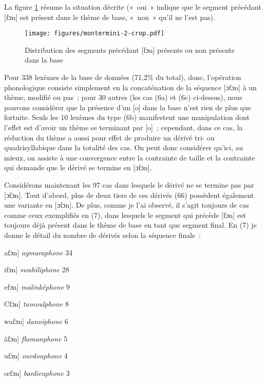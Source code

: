 \documentclass[output=paper]{langsci/langscibook}
\begin{document}
La figure \ref{fig:Montermini:2} résume la situation décrite («~oui~» indique que le segment
précédant {[}fɔn{]} est présent dans le thème de base, «~non~» qu'il ne
l'est pas).

\begin{figure} 
{\texttt{[image: figures/montermini-2-crop.pdf]}}
\caption{Distribution des segments précédant {[}fɔn{]}
présents ou non présents dans la base}
\label{fig:Montermini:2}
\end{figure}

Pour 338 lexèmes de la base de données (71,2\% du total), donc,
l'opération phonologique consiste simplement en la concaténation de la
séquence {[}ɔfɔn{]} à un thème, modifié ou pas~; pour 30 autres (les cas
(6a) et (6c) ci-dessus), nous pouvons considérer que la présence d'un
{[}o{]} dans la base n'est rien de plus que fortuite. Seuls les 10
lexèmes du type (6b) manifestent une manipulation dont l'effet est
d'avoir un thème se terminant par {[}o{]}~; cependant, dans ce cas, la
réduction du thème a aussi pour effet de produire un dérivé tri- ou
quadrisyllabique dans la totalité des cas. On peut donc considérer
qu'ici, au mieux, on assiste à une convergence entre la contrainte de
taille et la contrainte qui demande que le dérivé se termine en
{[}ɔfɔn{]}.

Considérons maintenant les 97 cas dans lesquels le dérivé ne se termine
pas par {[}ɔfɔn{]}. Tout d'abord, plus de deux tiers de ces dérivés (66)
possèdent également une variante en {[}ɔfɔn{]}. De plus, comme je l'ai
observé, il s'agit toujours de cas comme ceux exemplifiés en (7), dans
lesquels le segment qui précède {[}fɔn{]} est toujours déjà présent dans
le thème de base en tant que segment final. En (7) je donne le détail du
nombre de dérivés selon la séquence finale~:

\ea\label{ex:montermini:7}
    \ea {[}afɔn{]} \emph{aymaraphone} 34

    \ex {[}ifɔn{]} \emph{swahiliphone} 28

    \ex {[}efɔn{]} \emph{malinképhone} 9

    \ex {[}Cfɔn{]} \emph{tamoulphone} 8

    \ex {[}wafɔn{]} \emph{danoiphone} 6

    \ex {[}ãfɔn{]} \emph{flamanphone} 5

    \ex {[}ufɔn{]} \emph{ourdouphone} 4

    \ex {[}œfɔn{]} \emph{banlieuphone} 3
\z\z
\end{document}
